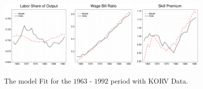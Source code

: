 \documentclass[notes,11pt, aspectratio=169]{beamer}
\begin{document}
\begin{frame}
{  \begin{figure}[H]
    \centering
    \includegraphics[width=0.3\textwidth]{../images/fig:korv_estimation_ls_slides.pdf}
    \hfill
    \includegraphics[width=0.3\textwidth]{../images/fig:korv_estimation_wbr_slides.pdf}
    \hfill
    \includegraphics[width=0.3\textwidth]{../images/fig:korv_estimation_sp_slides.pdf}
    \caption{\label{fig:korv_estimation} The model Fit for the $1963$ - $1992$ period with KORV Data.}
  \end{figure}
  }
\end{frame}
\end{document}
